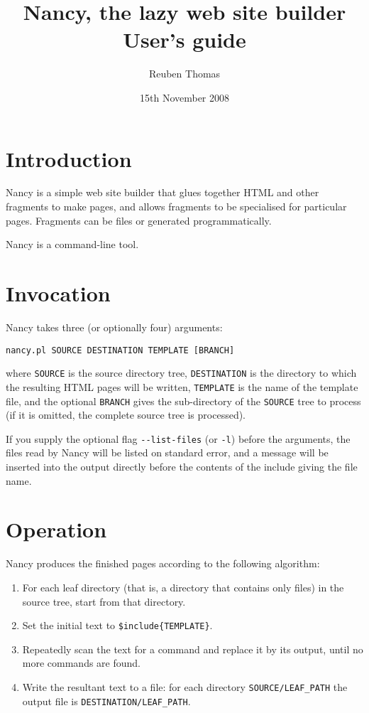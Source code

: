 \documentclass[english]{scrartcl}
\begin{document}
\title{Nancy, the lazy web site builder\\User's guide}
\date{15th November 2008}
\author{Reuben Thomas}
\maketitle

\section{Introduction}

Nancy is a simple web site builder that glues together HTML and other fragments to make pages, and allows fragments to be specialised for particular pages. Fragments can be files or generated programmatically.

Nancy is a command-line tool.

\section{Invocation}

Nancy takes three (or optionally four) arguments:

\begin{verbatim}
nancy.pl SOURCE DESTINATION TEMPLATE [BRANCH]
\end{verbatim}

\noindent where \verb|SOURCE| is the source directory tree, \verb|DESTINATION| is the directory to which the resulting HTML pages will be written, \verb|TEMPLATE| is the name of the template file, and the optional \verb|BRANCH| gives the sub-directory of the \verb|SOURCE| tree to process (if it is omitted, the complete source tree is processed).

If you supply the optional flag \verb|--list-files| (or \verb|-l|) before the arguments, the files read by Nancy will be listed on standard error, and a message will be inserted into the output directly before the contents of the include giving the file name.

\section{Operation}
\label{operation}

Nancy produces the finished pages according to the following algorithm:

\begin{enumerate}
\item For each leaf directory (that is, a directory that contains only files) in the source tree, start from that directory.
\item Set the initial text to \verb|$include{TEMPLATE}|.
\item Repeatedly scan the text for a command and replace it by its output, until no more commands are found.
\item Write the resultant text to a file: for each directory \verb|SOURCE/LEAF_PATH| the output file is \verb|DESTINATION/LEAF_PATH|.
\end{enumerate}
\end{document}
